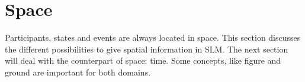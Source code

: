 %
%
%
%
%
%

\section{Space}\label{sec:func:Space}
Participants, states and events are always located in space. This section discusses the different possibilities to give spatial information in SLM. The next section will deal with the counterpart of space: time. Some concepts, like figure and ground are important for both domains.

